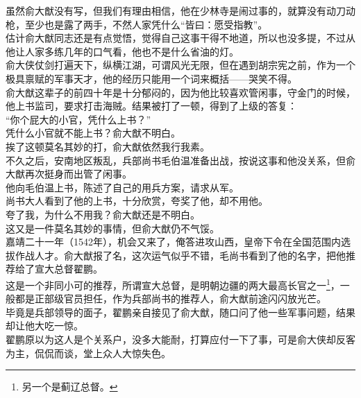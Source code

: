 \begin{multicols}{\theparacolNo}
虽然俞大猷没有写，但我们有理由相信，他在少林寺是闹过事的，就算没有动刀动枪，至少也是露了两手，不然人家凭什么“皆曰：愿受指教”。\\

估计俞大猷同志还是有点觉悟，觉得自己这事干得不地道，所以也没多提，不过从他让人家多练几年的口气看，他也不是什么省油的灯。\\

俞大侠仗剑打遍天下，纵横江湖，可谓风光无限，但在遇到胡宗宪之前，作为一个极具禀赋的军事天才，他的经历只能用一个词来概括——哭笑不得。\\

俞大猷这辈子的前四十年是十分郁闷的，因为他比较喜欢管闲事，守金门的时候，他上书监司，要求打击海贼。结果被打了一顿，得到了上级的答复：\\

“你个屁大的小官，凭什么上书？”\\

凭什么小官就不能上书？俞大猷不明白。\\

挨了这顿莫名其妙的打，俞大猷依然我行我素。\\

不久之后，安南地区叛乱，兵部尚书毛伯温准备出战，按说这事和他没关系，但俞大猷再次挺身而出管了闲事。\\

他向毛伯温上书，陈述了自己的用兵方案，请求从军。\\

尚书大人看到了他的上书，十分欣赏，夸奖了他，却不用他。\\

夸了我，为什么不用我？俞大猷还是不明白。\\

这又是一件莫名其妙的事情，但俞大猷仍不气馁。\\

嘉靖二十一年（1542年），机会又来了，俺答进攻山西，皇帝下令在全国范围内选拔作战人才。俞大猷报了名，这次运气似乎不错，毛尚书看到了他的名字，把他推荐给了宣大总督翟鹏。\\

这是一个非同小可的推荐，所谓宣大总督，是明朝边疆的两大最高长官之一\footnote{另一个是蓟辽总督。}，一般都是正部级官员担任，作为兵部尚书的推荐人，俞大猷前途闪闪放光芒。\\

毕竟是兵部领导的面子，翟鹏亲自接见了俞大猷，随口问了他一些军事问题，结果却让他大吃一惊。\\

翟鹏原以为这人是个关系户，没多大能耐，打算应付一下了事，可是俞大侠却反客为主，侃侃而谈，堂上众人大惊失色。\\


\end{multicols}
